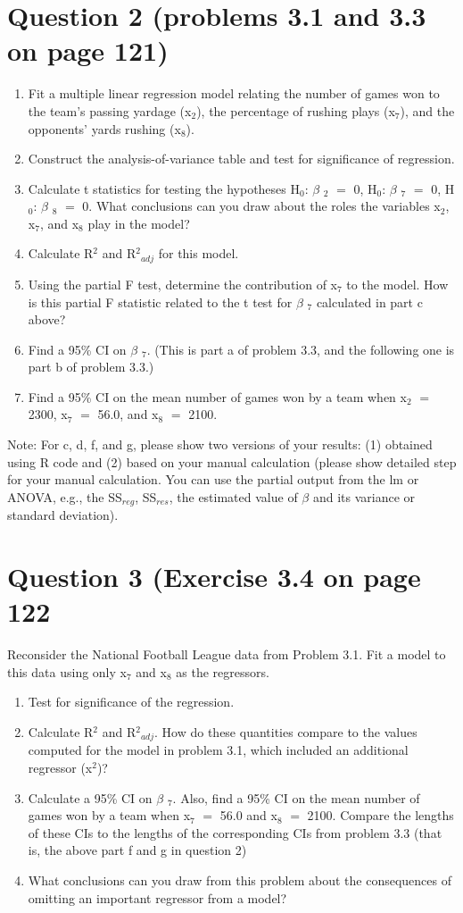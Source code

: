 \documentclass{article}
\newcommand{\mt}[1]{\ensuremath{#1}}
\newcommand\bsc[2][\DefaultOpt]{%
  \def\DefaultOpt{#2}%
  \section[#1]{#2}%
}
\newcommand{\balist}{\begin{enumerate}[label=\alph*.]}
\newcommand{\elist}{\end{enumerate}}
\newcommand{\bta}{\mt{\beta} }
\newcommand{\eql}{ \mt{\operatorname{=}} }
\newcommand{\uw}[2]{#1\mt{_{#2}}}
\newcommand{\uf}[2]{#1\mt{^{#2}}}
\begin{document}
\bsc{Question 2 (problems 3.1 and 3.3 on page 121)}{
\balist
\item Fit a multiple linear regression model relating the number of games won to the team's passing yardage (\uw{x}{2}), the percentage of rushing plays (\uw{x}{7}), and the opponents' yards rushing (\uw{x}{8}).
\item Construct the analysis-of-variance table and test for significance of regression.
\item Calculate t statistics for testing the hypotheses \uw{H}{0}: \uw{\bta}{2} \eql 0, \uw{H}{0}: \uw{\bta}{7} \eql 0, \uw{H}{0}: \uw{\bta}{8} \eql 0. What conclusions can you draw about the roles the variables \uw{x}{2}, \uw{x}{7}, and \uw{x}{8} play in the model?
\item Calculate \uf{R}{2} and \uw{\uf{R}{2}}{adj} for this model.
\item Using the partial F test, determine the contribution of \uw{x}{7} to the model. How is this partial F statistic related to the t test for \uw{\bta}{7} calculated in part c above?
\item Find a 95\% CI on \uw{\bta}{7}. (This is part a of problem 3.3, and the following one is part b of problem 3.3.)
\item Find a 95\% CI on the mean number of games won by a team when \uw{x}{2} \eql 2300, \uw{x}{7} \eql 56.0, and \uw{x}{8} \eql 2100.
\elist


Note: For c, d, f, and g, please show two versions of your results: (1) obtained using R code and (2) based on your manual calculation (please show detailed step for your manual calculation. You can use the partial output from the lm or ANOVA, e.g., the \uw{SS}{reg}, \uw{SS}{res}, the estimated value of \bta and its variance or standard deviation).

}

\bsc{Question 3 (Exercise 3.4 on page 122}{
Reconsider the National Football League data from Problem 3.1. Fit a model to this data using only \uw{x}{7} and \uw{x}{8} as the regressors.
\balist
\item Test for significance of the regression.
\item Calculate \uf{R}{2} and \uw{\uf{R}{2}}{adj}. How do these quantities compare to the values computed for the model in problem 3.1, which included an additional regressor (\uf{x}{2})?
\item Calculate a 95\% CI on \uw{\bta}{7}. Also, find a 95\% CI on the mean number of games won by a team when \uw{x}{7} \eql 56.0 and \uw{x}{8} \eql 2100. Compare the lengths of these CIs to the lengths of the corresponding CIs from problem 3.3 (that is, the above part f and g in question 2)
\item What conclusions can you draw from this problem about the consequences of omitting an important regressor from a model?
\elist

}
\end{document}
